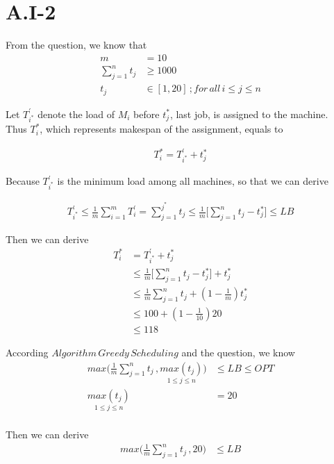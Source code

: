 \section*{A.I-2}
\label{sec:approx-1-2}

From the question, we know that
\begin{align*}
m &= 10\\
\sum\limits_{j=1}^n t_j &\ge 1000 \\
t_j  &\in [1,20] \,; for \, all \, i \le j \le n 
\end{align*}

Let $T^{\prime}_{i^*}$ denote the load of $M_i$ before $t_j^*$, last job, is assigned to the machine. \\
Thus $T_i^*$, which represents makespan of the assignment, equals to

\begin{align*}
T_i^* = T^{\prime}_{i^*} + t_j^*
\end{align*}

Because $T^{\prime}_{i^*}$ is the minimum load among all machines, so that we can derive

\begin{align*}
T^{\prime}_{i^*} \le \frac{1}{m}\sum\limits_{i=1}^m T^{\prime}_i = \sum\limits_{j=1}^{j^*} t_j \le \frac{1}{m} \bigg[ \sum\limits_{j=1}^n t_j - t_j^*  \bigg] \le LB
\end{align*}

Then we can derive
\begin{align*}
T_i^* &= T^{\prime}_{i^*} + t_j^* \\
&\le \frac{1}{m} \bigg[ \sum\limits_{j=1}^n t_j - t_j^*  \bigg] + t_j^* \\
&\le \frac{1}{m} \sum\limits_{j=1}^n t_j + ( 1 - \frac{1}{m} ) t_j^* \\
&\le 100 + ( 1 - \frac{1}{10} ) 20 \\
&\le 118
\end{align*}

According $Algorithm\, Greedy\, Scheduling$ and the question, we know
\begin{align*}
max \bigg( \frac{1}{m}\sum\limits_{j=1}^n t_j \, , \underset{1\le j \le n }{max(t_j) }\bigg) &\le LB \le OPT \\
\underset{1\le j \le n }{max(t_j)} &= 20 \\
\end{align*}

Then we can derive
\begin{align*}
max \bigg( \frac{1}{m}\sum\limits_{j=1}^n t_j \, , 20 \bigg) &\le LB
\end{align*}

